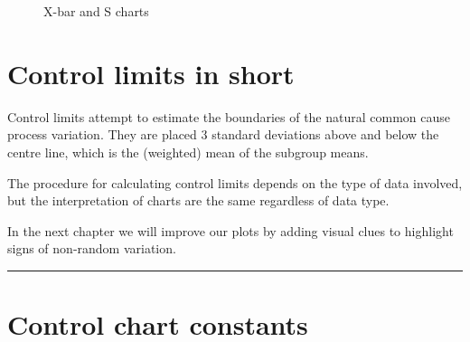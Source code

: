 \documentclass[
]{book}
\makeatletter
\newcommand*\pandocbounded[1]{%
  \sbox\pandoc@box{#1}%
  \Gscale@div\@tempa{\textheight}{\dimexpr\ht\pandoc@box+\dp\pandoc@box\relax}%
  \Gscale@div\@tempb{\linewidth}{\wd\pandoc@box}%
  \ifdim\@tempb\p@<\@tempa\p@\let\@tempa\@tempb\fi%
  \ifdim\@tempa\p@<\p@\scalebox{\@tempa}{\usebox\pandoc@box}%
  \else\usebox{\pandoc@box}%
  \fi%
}
\makeatother
\begin{document}
\begin{figure}
\centering
\pandocbounded{}
\caption{\label{fig:limits-xbarands}X-bar and S charts}
\end{figure}

\section{Control limits in short}\label{control-limits-in-short}

Control limits attempt to estimate the boundaries of the natural common cause process variation. They are placed 3 standard deviations above and below the centre line, which is the (weighted) mean of the subgroup means.

The procedure for calculating control limits depends on the type of data involved, but the interpretation of charts are the same regardless of data type.

In the next chapter we will improve our plots by adding visual clues to highlight signs of non-random variation.

\begin{center}\rule{0.5\linewidth}{0.5pt}\end{center}

\section*{Control chart constants}\label{chart-constants}
\end{document}
